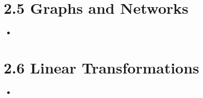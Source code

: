 \section{2.5 Graphs and Networks}
\begin{itemize}
  \item []

\end{itemize}

\section{2.6 Linear Transformations}
\begin{itemize}
  \item []

\end{itemize}
